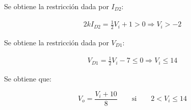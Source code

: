 Se obtiene la restricción dada por $I_{D2}$:

\begin{align*}
  2k I_{D2} = \frac{1}{2} V_i + 1 > 0
  \Rightarrow
  V_i > -2
\end{align*}

Se obtiene la restricción dada por $V_{D1}$:

\begin{align*}
  V_{D1} = \frac{1}{2} V_i - 7 \leq 0
  \Rightarrow
  V_i \leq 14
\end{align*}

Se obtiene que:

\begin{equation} \label{p3:offon}
  V_o = \frac{V_i + 10}{8}
  \quad
  \quad
  \mathrm{si}
  \quad
  \quad
  2 < V_i \leq 14
\end{equation}
